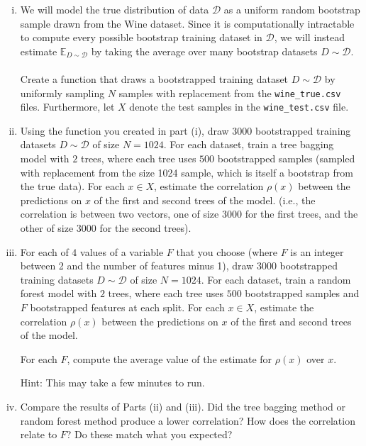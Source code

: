 \documentclass{exam}
\begin{document}
\begin{enumerate}[i.]
    \item We will model the true distribution of data $\mathcal{D}$ as a uniform random bootstrap sample drawn from the Wine dataset. Since it is computationally intractable to compute every possible bootstrap training dataset in $\mathcal{D}$, we will instead estimate $\mathbb{E}_{D \sim \mathcal{D}}$ by taking the average over many bootstrap datasets $D \sim \mathcal{D}$.
    \\\\
    Create a function that draws a bootstrapped training dataset $D \sim \mathcal{D}$ by uniformly sampling $N$ samples with replacement from the \texttt{wine\_true.csv} files. Furthermore, let $X$ denote the test samples in the \texttt{wine\_test.csv} file. 

    \item Using the function you created in part (i), draw $3000$ bootstrapped training datasets $D \sim \mathcal{D}$ of size $N=1024$. For each dataset, train a tree bagging model with $2$ trees, where each tree uses $500$ bootstrapped samples (sampled with replacement from the size 1024 sample, which is itself a bootstrap from the true data). For each $x \in X$, estimate the correlation $\rho(x)$ between the predictions on $x$ of the first and second trees of the model. (i.e., the correlation is between two vectors, one of size $3000$ for the first trees, and the other of size $3000$ for the second trees).

    \item For each of $4$ values of a variable $F$ that you choose (where $F$ is an integer between 2 and the number of features minus 1), draw $3000$ bootstrapped training datasets $D \sim \mathcal{D}$ of size $N=1024$. For each dataset, train a random forest model with $2$ trees, where each tree uses $500$ bootstrapped samples and $F$ bootstrapped features at each split. For each $x \in X$, estimate the correlation $\rho(x)$ between the predictions on $x$ of the first and second trees of the model.

    For each $F$, compute the average value of the estimate for $\rho(x)$ over $x$.

    Hint: This may take a few minutes to run.

    \item Compare the results of Parts (ii) and (iii). Did the tree bagging method or random forest method produce a lower correlation? How does the correlation relate to $F$? Do these match what you expected?

\end{enumerate}
\end{document}

